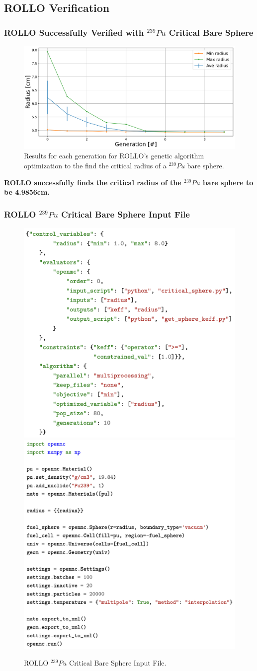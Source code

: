 \subsection{ROLLO Verification}
\begin{frame}
    \frametitle{ROLLO Successfully Verified with $^{239}Pu$ Critical Bare Sphere}
    \begin{figure}
        \includegraphics[width=0.85\linewidth]{../docs/figures/radius-convergence.png} 
        \caption{Results for each generation for \gls{ROLLO}'s genetic algorithm 
        optimization to the find the critical radius of a  $^{239}Pu$ bare sphere.}
    \end{figure}
    \vspace{-0.2cm}
    \textbf{ROLLO successfully finds the critical radius of the $^{239}Pu$ bare sphere 
    to be 4.9856cm.}
\end{frame}

\begin{frame}
    \frametitle{ROLLO $^{239}Pu$ Critical Bare Sphere Input File}
    \begin{figure}
        \includegraphics[width=0.49\linewidth]{figures/rollo-verify-file.png} 
        \includegraphics[width=0.49\linewidth]{figures/rollo-verify-file2.png}
        \caption{ROLLO $^{239}Pu$ Critical Bare Sphere Input File.}
    \end{figure}
\end{frame}

